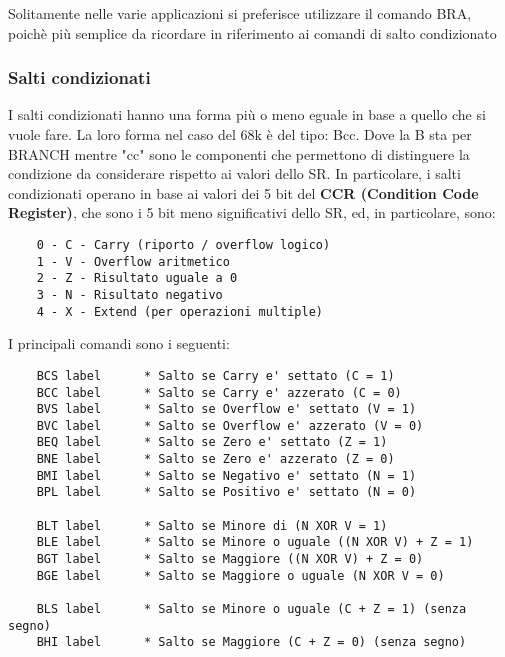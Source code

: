 Solitamente nelle varie applicazioni si preferisce utilizzare il comando BRA, poichè più semplice da ricordare in riferimento ai comandi di salto condizionato

\subsubsection{Salti condizionati}
I salti condizionati hanno una forma più o meno eguale in base a quello che si vuole fare. La loro forma nel caso del 68k è del tipo: Bcc. Dove la B sta per BRANCH mentre "cc" sono le componenti che permettono di distinguere la condizione da considerare rispetto ai valori dello SR. In particolare, i salti condizionati operano in base ai valori dei 5 bit del \textbf{CCR (Condition Code Register)}, che sono i 5 bit meno significativi dello SR, ed, in particolare, sono:
\begin{lstlisting}
    0 - C - Carry (riporto / overflow logico)
    1 - V - Overflow aritmetico
    2 - Z - Risultato uguale a 0
    3 - N - Risultato negativo
    4 - X - Extend (per operazioni multiple)
\end{lstlisting}

I principali comandi sono i seguenti:
\begin{lstlisting}
    BCS label      * Salto se Carry e' settato (C = 1)
    BCC label      * Salto se Carry e' azzerato (C = 0)
    BVS label      * Salto se Overflow e' settato (V = 1)
    BVC label      * Salto se Overflow e' azzerato (V = 0)
    BEQ label      * Salto se Zero e' settato (Z = 1)
    BNE label      * Salto se Zero e' azzerato (Z = 0)
    BMI label      * Salto se Negativo e' settato (N = 1)
    BPL label      * Salto se Positivo e' settato (N = 0)

    BLT label      * Salto se Minore di (N XOR V = 1)
    BLE label      * Salto se Minore o uguale ((N XOR V) + Z = 1)
    BGT label      * Salto se Maggiore ((N XOR V) + Z = 0)
    BGE label      * Salto se Maggiore o uguale (N XOR V = 0)

    BLS label      * Salto se Minore o uguale (C + Z = 1) (senza segno)
    BHI label      * Salto se Maggiore (C + Z = 0) (senza segno)
\end{lstlisting}

\newpage

